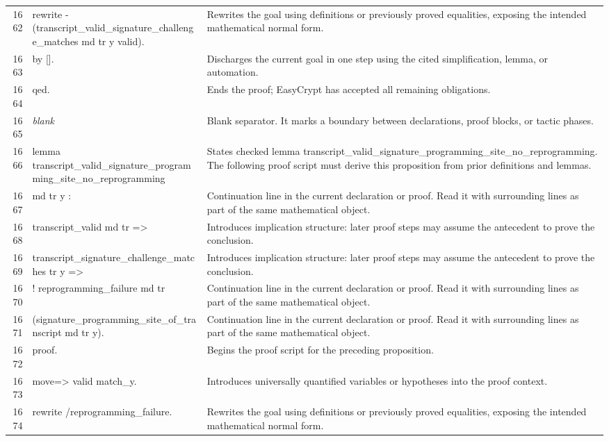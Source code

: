 \documentclass[10pt]{article}
\begin{document}
\begin{longtable}{r L{0.53\textwidth} L{0.37\textwidth}}
1662 & {\ttfamily\scriptsize rewrite -(transcript\_valid\_signature\_challenge\_matches md tr y valid).} & Rewrites the goal using definitions or previously proved equalities, exposing the intended mathematical normal form. \\
1663 & {\ttfamily\scriptsize by [].} & Discharges the current goal in one step using the cited simplification, lemma, or automation. \\
1664 & {\ttfamily\scriptsize qed.} & Ends the proof; EasyCrypt has accepted all remaining obligations. \\
1665 & {\ttfamily\scriptsize \emph{blank}} & Blank separator.  It marks a boundary between declarations, proof blocks, or tactic phases. \\
1666 & {\ttfamily\scriptsize lemma transcript\_valid\_signature\_programming\_site\_no\_reprogramming} & States checked lemma transcript\_valid\_signature\_programming\_site\_no\_reprogramming.  The following proof script must derive this proposition from prior definitions and lemmas. \\
1667 & {\ttfamily\scriptsize   md tr y :} & Continuation line in the current declaration or proof.  Read it with surrounding lines as part of the same mathematical object. \\
1668 & {\ttfamily\scriptsize   transcript\_valid md tr =>} & Introduces implication structure: later proof steps may assume the antecedent to prove the conclusion. \\
1669 & {\ttfamily\scriptsize   transcript\_signature\_challenge\_matches tr y =>} & Introduces implication structure: later proof steps may assume the antecedent to prove the conclusion. \\
1670 & {\ttfamily\scriptsize   ! reprogramming\_failure md tr} & Continuation line in the current declaration or proof.  Read it with surrounding lines as part of the same mathematical object. \\
1671 & {\ttfamily\scriptsize       (signature\_programming\_site\_of\_transcript md tr y).} & Continuation line in the current declaration or proof.  Read it with surrounding lines as part of the same mathematical object. \\
1672 & {\ttfamily\scriptsize proof.} & Begins the proof script for the preceding proposition. \\
1673 & {\ttfamily\scriptsize move=> valid match\_y.} & Introduces universally quantified variables or hypotheses into the proof context. \\
1674 & {\ttfamily\scriptsize rewrite /reprogramming\_failure.} & Rewrites the goal using definitions or previously proved equalities, exposing the intended mathematical normal form. \\

\end{longtable}
\end{document}
